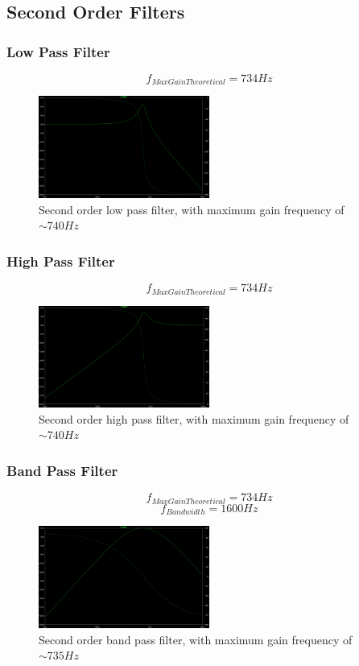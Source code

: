 \documentclass[10pt]{article}
\begin{document}
\subsection*{Second Order Filters}
\subsubsection*{Low Pass Filter}
$$f_{MaxGainTheoretical} = 734 Hz$$
\begin{figure}[H]
	\centering
	\includegraphics[width=0.5\textwidth]{PreLowPassSecond.png}
	\caption{Second order low pass filter, with maximum gain frequency of $\sim 740Hz$}
\end{figure}

\subsubsection*{High Pass Filter}
$$f_{MaxGainTheoretical} = 734 Hz$$
\begin{figure}[H]
	\centering
	\includegraphics[width=0.5\textwidth]{PreHighPassSecond.png}
	\caption{Second order high pass filter, with maximum gain frequency of $\sim 740Hz$}
\end{figure}

\subsubsection*{Band Pass Filter}
$$f_{MaxGainTheoretical} = 734 Hz$$
$$f_{Bandwidth} = 1600Hz$$
\begin{figure}[H]
	\centering
	\includegraphics[width=0.5\textwidth]{PreBandPass.png}
	\caption{Second order band pass filter, with maximum gain frequency of $\sim 735Hz$}
\end{figure}
\end{document}
